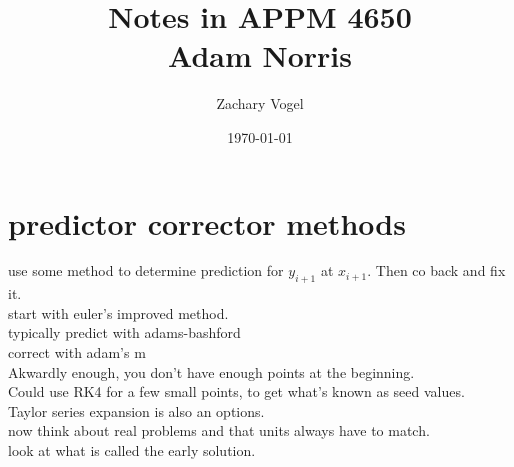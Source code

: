 \documentclass{article}
\begin{document}
\author{Zachary Vogel}
\date{\today}
\title{Notes in APPM 4650\\Adam Norris}

\maketitle



\section{predictor corrector methods}
use some method to determine prediction for $y_{i+1}$ at $x_{i+1}$. Then co back and fix it.\\
start with euler's improved method.\\
typically predict with adams-bashford\\
correct with adam's m\\
Akwardly enough, you don't have enough points at the beginning.\\
Could use RK4 for a few small points, to get what's known as seed values.\\
Taylor series expansion is also an options.\\

now think about real problems and that units always have to match.\\


look at what is called the early solution.\\
\end{document}
